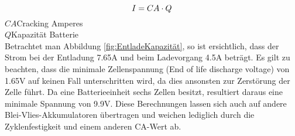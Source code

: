 \begin{equation}
\centering
I=CA \cdot Q
\label{eq:CA}
\end{equation}
$ CA $\quad 	Cracking Amperes      \\
$ Q $\qquad  Kapazität Batterie     \\

Betrachtet man Abbildung \ref{fig:EntladeKapazität}, so ist ersichtlich, dass der Strom bei der Entladung 7.65A und beim Ladevorgang 4.5A beträgt.
Es gilt zu beachten, dass die minimale Zellenspannung (End of life discharge voltage) von 1.65V auf keinen Fall unterschritten wird, da dies ansonsten zur Zerstörung der Zelle führt. Da eine Batterieeinheit sechs Zellen besitzt, resultiert daraus eine minimale Spannung von 9.9V. Diese Berechnungen lassen sich auch auf andere Blei-Vlies-Akkumulatoren übertragen und weichen lediglich durch die Zyklenfestigkeit und einem anderen CA-Wert ab.